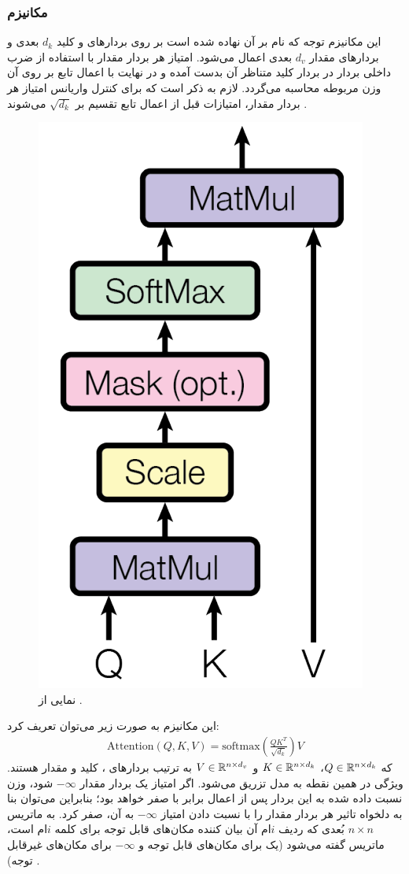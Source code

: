\subsubsection{مکانیزم
	}
این مکانیزم توجه که نام \dotattention{} بر آن نهاده شده است بر روی بردارهای \query{} و کلید $d_k$ بعدی و بردارهای مقدار $d_v$ بعدی اعمال می‌شود. امتیاز هر بردار مقدار با استفاده از ضرب داخلی بردار \query{} در بردار کلید متناظر آن بدست آمده و در نهایت با اعمال تابع \softmax{} بر روی آن وزن مربوطه محاسبه می‌گردد. لازم به ذکر است که برای کنترل واریانس امتیاز هر بردار مقدار، امتیازات قبل از اعمال تابع \softmax{} تقسیم بر $\sqrt{d_k}$ می‌شوند \cite{transformer}.
\begin{figure}[H]
	\centering
	\includegraphics[width=.25
		\textwidth]{images/attention1.png}
	\caption{نمایی از \dotattention{}
    \cite{transformer}.}
\end{figure}
این مکانیزم به صورت زیر می‌توان تعریف کرد:
\begin{align}
	\text{Attention}(Q, K, V) = \text{softmax}(\frac{QK^T}{\sqrt{d_k}})V
\end{align}
که
$Q \in {\mathbb{R}}^{n \times d_k}$،
$K \in {\mathbb{R}}^{n \times d_k}$ و
$V \in {\mathbb{R}}^{n \times d_v}$
به ترتیب بردارهای \query{}، کلید و مقدار هستند.
ویژگی \autoregressive{} در همین نقطه به مدل تزریق می‌شود. اگر امتیاز یک بردار مقدار $-\infty$ شود، وزن نسبت داده شده به این بردار پس از اعمال \softmax{} برابر با صفر خواهد بود؛ بنابراین می‌توان بنا به دلخواه تاثیر هر بردار مقدار را با نسبت دادن  امتیاز $-\infty$ به آن، صفر کرد. به ماتریس $n \times n$ بُعدی که ردیف $i$ام آن بیان کننده مکان‌های قابل توجه برای کلمه $i$ام است، ماتریس
گفته می‌شود (یک برای مکان‌های قابل توجه و $-\infty$ برای مکان‌های غیرقابل توجه) \cite{transformer}.

